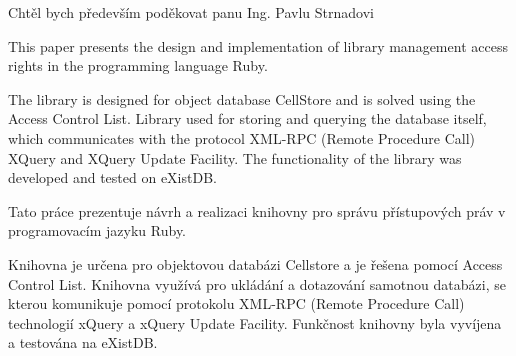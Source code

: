 \documentclass[11pt,twoside,a4paper]{book}
\begin{document}

\coverpagestarts


\acknowledgements
\noindent
Chtěl bych především poděkovat panu Ing. Pavlu Strnadovi%




 
\abstractpage

This paper presents the design and implementation of library management access rights in the programming language Ruby.

The library is designed for object database CellStore and is solved using the Access Control List. Library used for storing and querying the database itself, which communicates with the protocol XML-RPC (Remote Procedure Call) XQuery and XQuery Update Facility.
The functionality of the library was developed and tested on eXistDB.


\baselineskip

\noindent
Tato práce prezentuje návrh a realizaci knihovny pro správu přístupových práv v programovacím jazyku Ruby. 

Knihovna  je určena pro objektovou databázi Cellstore a je řešena pomocí Access Control List. Knihovna využívá pro ukládání a dotazování samotnou databázi, se kterou komunikuje pomocí protokolu XML-RPC (Remote Procedure Call) technologií xQuery a xQuery Update Facility. 
Funkčnost knihovny byla vyvíjena a testována na eXistDB.


\noindent


\tableofcontents


\end{document}

